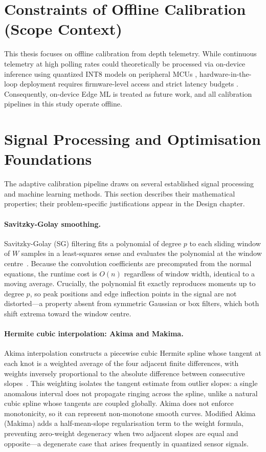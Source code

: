 \section{Constraints of Offline Calibration (Scope Context)}

This thesis focuses on offline calibration from depth telemetry. While continuous telemetry at high polling rates could theoretically be processed via on-device inference using quantized INT8 models on peripheral MCUs \cite{tinyml_mcu_inference}, hardware-in-the-loop deployment requires firmware-level access and strict latency budgets \cite{monaco_sok_2018}. Consequently, on-device Edge ML is treated as future work, and all calibration pipelines in this study operate offline.

\section{Signal Processing and Optimisation Foundations}
\label{sec:background-foundations}

The adaptive calibration pipeline draws on several established signal processing and machine learning methods. This section describes their mathematical properties; their problem-specific justifications appear in the Design chapter.

\paragraph{Savitzky-Golay smoothing.}
Savitzky-Golay (SG) filtering fits a polynomial of degree $p$ to each sliding window of $W$ samples in a least-squares sense and evaluates the polynomial at the window centre~\cite{savitzky_golay_1964}. Because the convolution coefficients are precomputed from the normal equations, the runtime cost is $O(n)$ regardless of window width, identical to a moving average. Crucially, the polynomial fit exactly reproduces moments up to degree $p$, so peak positions and edge inflection points in the signal are not distorted—a property absent from symmetric Gaussian or box filters, which both shift extrema toward the window centre.

\paragraph{Hermite cubic interpolation: Akima and Makima.}
Akima interpolation constructs a piecewise cubic Hermite spline whose tangent at each knot is a weighted average of the four adjacent finite differences, with weights inversely proportional to the absolute difference between consecutive slopes~\cite{akima_1970}. This weighting isolates the tangent estimate from outlier slopes: a single anomalous interval does not propagate ringing across the spline, unlike a natural cubic spline whose tangents are coupled globally. Akima does not enforce monotonicity, so it can represent non-monotone smooth curves. Modified Akima (Makima) adds a half-mean-slope regularisation term to the weight formula, preventing zero-weight degeneracy when two adjacent slopes are equal and opposite—a degenerate case that arises frequently in quantized sensor signals.

